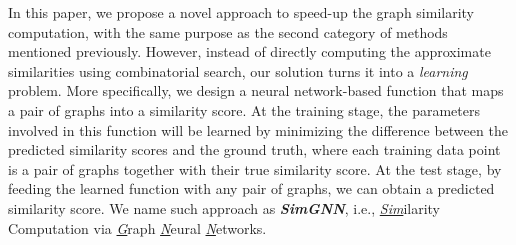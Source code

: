 \documentclass[sigconf]{acmart}
\begin{document}
In this paper, we propose a novel approach to speed-up the graph similarity computation, with the same purpose as the second category of methods mentioned previously. However, instead of directly computing the approximate similarities using combinatorial search, our solution turns it into a \emph{learning} problem. More specifically, we design a neural network-based function that maps a pair of graphs into a similarity score.  At the training stage, the parameters involved in this function will be learned by minimizing the difference between the predicted similarity scores and the ground truth, where each training data point is a pair of graphs together with their true similarity score. At the test stage, by feeding the learned function with any pair of graphs, we can obtain a predicted similarity score. We name such approach as \emph{\textbf{SimGNN}}, i.e., \emph{\underline{Sim}}ilarity Computation via \emph{\underline{G}}raph \emph{\underline{N}}eural \emph{\underline{N}}etworks. 
\end{document}
